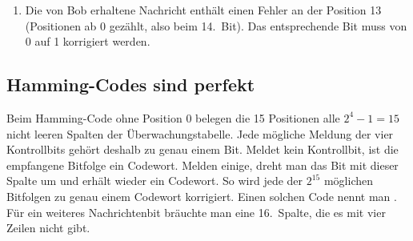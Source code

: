 \begin{myexercise}
\begin{myanswer}
\begin{enumerate}
            \item Die von Bob erhaltene Nachricht enthält einen
                  Fehler an der Position 13 (Positionen ab 0 gezählt,
                  also beim 14.\ Bit). Das entsprechende Bit
                  muss von 0 auf 1 korrigiert werden.

                  \begin{center}
                  \end{center}
        \end{enumerate}

    \end{myanswer}

\end{myexercise}

\subsection*{Hamming-Codes sind perfekt}

Beim Hamming-Code ohne Position 0 belegen die 15 Positionen alle
\(2^4-1=15\) nicht leeren Spalten der Überwachungstabelle. Jede
mögliche Meldung der vier Kontrollbits gehört deshalb zu genau
einem Bit. Meldet kein Kontrollbit, ist die empfangene Bitfolge ein
Codewort. Melden einige, dreht man das Bit mit dieser Spalte um und
erhält wieder ein Codewort. So wird jede der \(2^{15}\) möglichen
Bitfolgen zu genau einem Codewort korrigiert. Einen solchen Code
nennt man . Für ein weiteres Nachrichtenbit bräuchte
man eine 16.\ Spalte, die es mit vier Zeilen nicht gibt.

